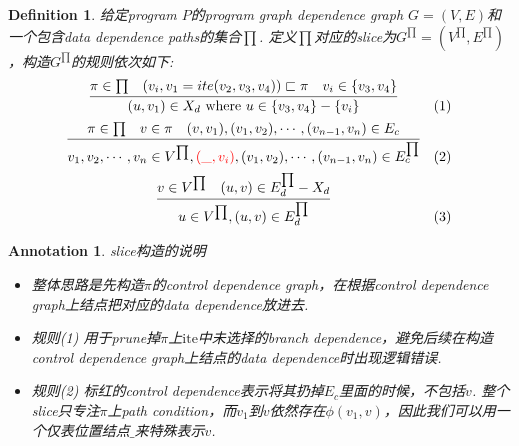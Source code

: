 \documentclass{article}
\newtheorem{definition}[theorem]{Definition}
\newtheorem{annotation}[theorem]{Annotation}
\begin{document}
\begin{definition}
\rm 给定program $P$的program graph dependence graph $G=(V,E)$和一个包含data dependence paths的集合$\prod$. 定义$\prod$对应的slice为$G^{\prod} = (V^{\prod},E^{\prod})$，构造$G^{\prod}$的规则依次如下:
$$
\begin{array}{cl}
\infer{(u,v_1) \in X_d~\text{where}~u \in \{v_3,v_4\}-\{v_i\}}{\pi \in \prod & (v_i,v_1=ite(v_2,v_3,v_4)) \sqsubset \pi & v_i \in \{v_3,v_4\}} & (1) \\[0.5em]
\infer{v_1,v_2,\cdots,v_n \in V^{\prod}, {\color{red}(\_,v_i)},(v_1,v_2),\cdots,(v_{n-1},v_n) \in E_c^{\prod}}{\pi \in \prod & v \in \pi & (v,v_1),(v_1,v_2),\cdots,(v_{n-1},v_n) \in E_c} & (2) \\[0.5em]
\infer{u \in V^{\prod}, (u,v) \in E_d^{\prod}}{v \in V^{\prod} & (u,v) \in E_d^{\prod}-X_d} & (3)
\end{array}
$$
\end{definition}

\begin{annotation}
\rm slice构造的说明
\begin{itemize}
	\item 整体思路是先构造$\pi$的control dependence graph，在根据control dependence graph上结点把对应的data dependence放进去. 
	\item 规则(1) 用于prune掉$\pi$上$\text{ite}$中未选择的branch  dependence，避免后续在构造control dependence graph上结点的data dependence时出现逻辑错误.
	\item 规则(2) 标红的control dependence表示将其扔掉$E_c$里面的时候，不包括$v$. 整个slice只专注$\pi$上path condition，而$v_1$到$v$依然存在$\phi(v_1,v)$，因此我们可以用一个仅表位置结点$\_$来特殊表示$v$.  
\end{itemize}
\end{annotation}
\end{document}
